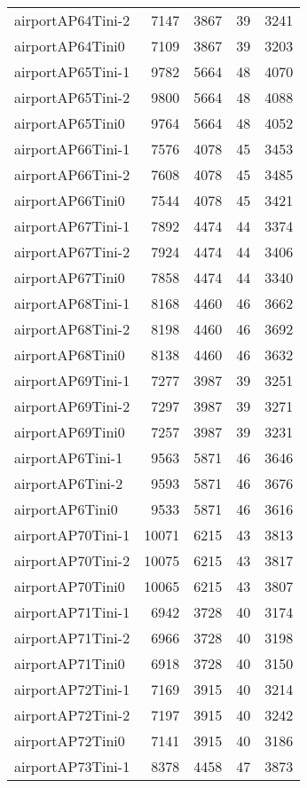 \documentclass[../../../thesis.tex]{subfiles}
\begin{document}
\begin{longtable}{lrrrr}
airportAP64Tini-2 & 7147 & 3867 & 39 & 3241 \\
airportAP64Tini0 & 7109 & 3867 & 39 & 3203 \\
airportAP65Tini-1 & 9782 & 5664 & 48 & 4070 \\
airportAP65Tini-2 & 9800 & 5664 & 48 & 4088 \\
airportAP65Tini0 & 9764 & 5664 & 48 & 4052 \\
airportAP66Tini-1 & 7576 & 4078 & 45 & 3453 \\
airportAP66Tini-2 & 7608 & 4078 & 45 & 3485 \\
airportAP66Tini0 & 7544 & 4078 & 45 & 3421 \\
airportAP67Tini-1 & 7892 & 4474 & 44 & 3374 \\
airportAP67Tini-2 & 7924 & 4474 & 44 & 3406 \\
airportAP67Tini0 & 7858 & 4474 & 44 & 3340 \\
airportAP68Tini-1 & 8168 & 4460 & 46 & 3662 \\
airportAP68Tini-2 & 8198 & 4460 & 46 & 3692 \\
airportAP68Tini0 & 8138 & 4460 & 46 & 3632 \\
airportAP69Tini-1 & 7277 & 3987 & 39 & 3251 \\
airportAP69Tini-2 & 7297 & 3987 & 39 & 3271 \\
airportAP69Tini0 & 7257 & 3987 & 39 & 3231 \\
airportAP6Tini-1 & 9563 & 5871 & 46 & 3646 \\
airportAP6Tini-2 & 9593 & 5871 & 46 & 3676 \\
airportAP6Tini0 & 9533 & 5871 & 46 & 3616 \\
airportAP70Tini-1 & 10071 & 6215 & 43 & 3813 \\
airportAP70Tini-2 & 10075 & 6215 & 43 & 3817 \\
airportAP70Tini0 & 10065 & 6215 & 43 & 3807 \\
airportAP71Tini-1 & 6942 & 3728 & 40 & 3174 \\
airportAP71Tini-2 & 6966 & 3728 & 40 & 3198 \\
airportAP71Tini0 & 6918 & 3728 & 40 & 3150 \\
airportAP72Tini-1 & 7169 & 3915 & 40 & 3214 \\
airportAP72Tini-2 & 7197 & 3915 & 40 & 3242 \\
airportAP72Tini0 & 7141 & 3915 & 40 & 3186 \\
airportAP73Tini-1 & 8378 & 4458 & 47 & 3873 \\

\end{longtable}
\end{document}
